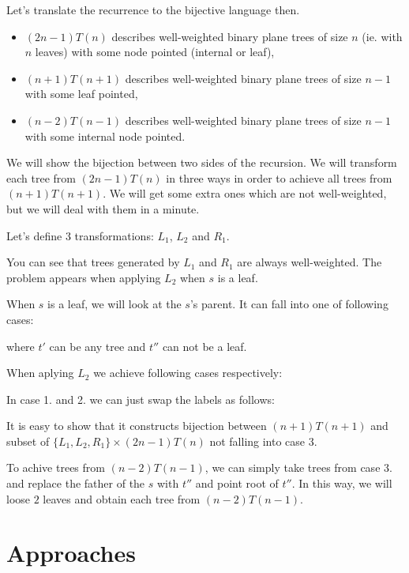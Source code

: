 \documentclass[final]{article}
\theoremstyle{definition}
\theoremstyle{remark}
\begin{document}
Let's translate the recurrence to the bijective language then.
\begin{itemize}
    \item \((2 n - 1) T(n)\) describes well-weighted binary plane trees of size \(n\) (ie. with \(n\) leaves) with some node pointed (internal or leaf),
    \item \((n + 1) T(n + 1)\) describes well-weighted binary plane trees of size \(n - 1\) with some leaf pointed,
    \item \((n - 2) T(n - 1)\) describes well-weighted binary plane trees of size \(n - 1\) with some internal node pointed.
\end{itemize}

We will show the bijection between two sides of the recursion. We will transform each tree from \((2 n - 1) T(n)\) in three ways in order to achieve all trees from \((n + 1) T(n + 1)\). We will get some extra ones which are not well-weighted, but we will deal with them in a minute.

Let's define 3 transformations: \(L_1\), \(L_2\) and \(R_1\).


You can see that trees generated by \(L_1\) and \(R_1\) are always well-weighted. The problem appears when applying \(L_2\) when \(s\) is a leaf.

When \(s\) is a leaf, we will look at the \(s\)'s parent. It can fall into one of following cases:


where \(t'\) can be any tree and \(t''\) can not be a leaf.

When aplying \(L_2\) we achieve following cases respectively:


In case 1. and 2. we can just swap the labels as follows:


It is easy to show that it constructs bijection between \((n + 1) T(n + 1)\) and subset of \(\{L_1, L_2, R_1\} \times (2 n - 1) T(n)\) not falling into case 3.

To achive trees from \((n - 2) T(n - 1)\), we can simply take trees from case 3. and replace the father of the \(s\) with \(t''\) and point root of \(t''\). In this way, we will loose \(2\) leaves and obtain each tree from \((n - 2) T(n - 1)\).


\section{Approaches}%
\label{sec:approaches}
\end{document}
